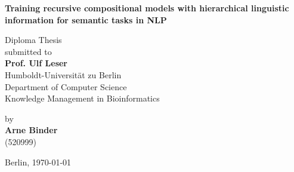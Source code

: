\begin{center}

    {\Large{\bf Training recursive compositional models with hierarchical linguistic information for semantic tasks in NLP}} \vspace{0.5cm}


    {\normalsize Diploma Thesis \\\vspace{0.5cm}
    submitted to}\\\vspace{0.5cm}
    {\normalsize{\bf Prof. Ulf Leser}} \\\vspace{0.5cm}
    {\normalsize Humboldt-Universität zu Berlin \\
    Department of Computer Science \\
    Knowledge Management in Bioinformatics} \vspace{1cm}


    {\normalsize by \\\vspace{0.5cm}
    {\bf Arne Binder} \\
    (520999)} \vspace{1cm}


    {\normalsize Berlin, \today}

\end{center}
